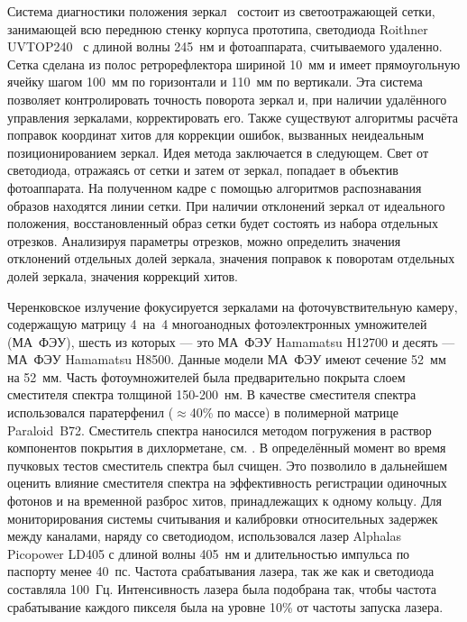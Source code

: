 Система диагностики положения зеркал~\cite{JORDANPR14} состоит из светоотражающей сетки, занимающей всю переднюю стенку корпуса прототипа, светодиода Roithner UVTOP240~\cite{LED} с длиной волны 245~нм и фотоаппарата, считываемого удаленно. Сетка сделана из полос ретрорефлектора шириной 10~мм и имеет прямоугольную ячейку шагом 100~мм по горизонтали и 110~мм по вертикали. Эта система позволяет контролировать точность поворота зеркал и, при наличии удалённого управления зеркалами, корректировать его. Также существуют алгоритмы расчёта поправок координат хитов для коррекции ошибок, вызванных неидеальным позиционированием зеркал. Идея метода заключается в следующем. Свет от светодиода, отражаясь от сетки и затем от зеркал, попадает в объектив фотоаппарата. На полученном кадре с помощью алгоритмов распознавания образов находятся линии сетки. При наличии отклонений зеркал от идеального положения, восстановленный образ сетки будет состоять из набора отдельных отрезков. Анализируя параметры отрезков, можно определить значения отклонений отдельных долей зеркала, значения поправок к поворотам отдельных долей зеркала, значения коррекций хитов.

Черенковское излучение фокусируется зеркалами на фоточувствительную камеру, содержащую матрицу 4~на~4 многоанодных фотоэлектронных умножителей (МА~ФЭУ), шесть из которых --- это МА~ФЭУ Hamamatsu H12700 и десять --- МА~ФЭУ Hamamatsu H8500. Данные модели МА~ФЭУ имеют сечение 52~мм на 52~мм. Часть фотоумножителей была предварительно покрыта слоем сместителя спектра толщиной 150-200~нм. В качестве сместителя спектра использовался паратерфенил ($\approx$40\% по массе) в полимерной матрице Paraloid~B72. Сместитель спектра наносился методом погружения в раствор компонентов покрытия в дихлорметане, см. \cite{WLSINFLUENCE}. В определённый момент во время пучковых тестов сместитель спектра был счищен. Это позволило в дальнейшем оценить влияние сместителя спектра на эффективность регистрации одиночных фотонов и на временной разброс хитов, принадлежащих к одному кольцу. Для мониторирования системы считывания и калибровки относительных задержек между каналами, наряду со светодиодом, использовался лазер Alphalas Picopower LD405 с длиной волны 405~нм и длительностью импульса по паспорту менее 40~пс. Частота срабатывания лазера, так же как и светодиода составляла 100~Гц. Интенсивность лазера была подобрана так, чтобы частота срабатывание каждого пикселя была на уровне 10\% от частоты запуска лазера.

